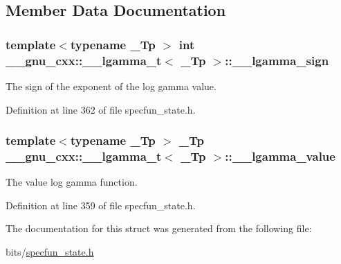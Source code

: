 \subsection{Member Data Documentation}
\subsubsection[{\texorpdfstring{\+\_\+\+\_\+lgamma\+\_\+sign}{__lgamma_sign}}]{\setlength{\rightskip}{0pt plus 5cm}template$<$typename \+\_\+\+Tp $>$ int {\bf \+\_\+\+\_\+gnu\+\_\+cxx\+::\+\_\+\+\_\+lgamma\+\_\+t}$<$ \+\_\+\+Tp $>$\+::\+\_\+\+\_\+lgamma\+\_\+sign}\hypertarget{struct____gnu__cxx_1_1____lgamma__t_a8aecdc9e5f69e729e96dc50f0c57b331}{}\label{struct____gnu__cxx_1_1____lgamma__t_a8aecdc9e5f69e729e96dc50f0c57b331}


The sign of the exponent of the log gamma value. 



Definition at line 362 of file specfun\+\_\+state.\+h.

\subsubsection[{\texorpdfstring{\+\_\+\+\_\+lgamma\+\_\+value}{__lgamma_value}}]{\setlength{\rightskip}{0pt plus 5cm}template$<$typename \+\_\+\+Tp $>$ \+\_\+\+Tp {\bf \+\_\+\+\_\+gnu\+\_\+cxx\+::\+\_\+\+\_\+lgamma\+\_\+t}$<$ \+\_\+\+Tp $>$\+::\+\_\+\+\_\+lgamma\+\_\+value}\hypertarget{struct____gnu__cxx_1_1____lgamma__t_a916af5560acafd8dcf25c42fd28deef5}{}\label{struct____gnu__cxx_1_1____lgamma__t_a916af5560acafd8dcf25c42fd28deef5}


The value log gamma function. 



Definition at line 359 of file specfun\+\_\+state.\+h.



The documentation for this struct was generated from the following file\+:\begin{DoxyCompactItemize}
\item 
bits/\hyperlink{specfun__state_8h}{specfun\+\_\+state.\+h}\end{DoxyCompactItemize}
